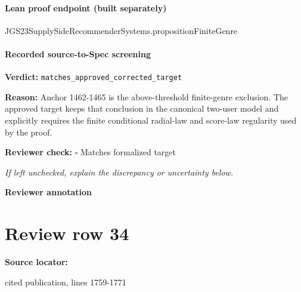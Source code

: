 \documentclass[10pt]{article}
\newcommand{\reviewerbox}{%
  \par\noindent\fbox{\parbox{0.96\linewidth}{\rule{0pt}{0.38in}}}\par
}
\newcommand{\reviewmatch}[1]{%
  \par\noindent\textbf{Reviewer check:} $\square$\; #1\par
  \noindent\emph{If left unchecked, explain the discrepancy or uncertainty below.}\par
}
\begin{document}
\paragraph{Lean proof endpoint (built separately)}\begin{ReviewVerbatim}
JGS23SupplySideRecommenderSystems.propositionFiniteGenre
\end{ReviewVerbatim}

\paragraph{Recorded source-to-Spec screening}
\textbf{Verdict:} \texttt{matches\_approved\_corrected\_target}
\\
{\raggedright
\textbf{Reason:} Anchor 1462-\allowbreak{}1465 is the above-\allowbreak{}threshold finite-\allowbreak{}genre exclusion.\allowbreak{}  The approved target keeps that conclusion in the canonical two-\allowbreak{}user model and explicitly requires the finite conditional radial-\allowbreak{}law and score-\allowbreak{}law regularity used by the proof.\allowbreak{}
\par}
\reviewmatch{Matches formalized target}
\noindent\textbf{Reviewer annotation}\par
\reviewerbox
\clearpage
\hypertarget{source-claim-9bd932dbe3201df7}{}
\section*{Review row 34}
\textbf{Source locator:} {\footnotesize\raggedright cited publication, lines 1759-\allowbreak{}1771\par}
\end{document}
